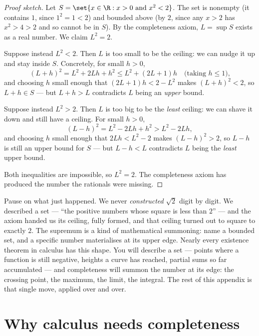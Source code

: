 \begin{proof}[Proof sketch]
Let $S = \set{x\in\R : x > 0 \text{ and } x^2 < 2}$. The set is nonempty (it contains $1$,
since $1^2=1<2$) and bounded above (by $2$, since any $x>2$ has $x^2>4>2$ and so cannot be
in $S$). By the completeness axiom, $L=\sup S$ exists as a real number. We claim $L^2=2$.

Suppose instead $L^2 < 2$. Then $L$ is too small to be the ceiling: we can nudge it up and
stay inside $S$. Concretely, for small $h>0$,
\[
  (L+h)^2 = L^2 + 2Lh + h^2 \le L^2 + (2L+1)h \quad\text{(taking $h\le 1$),}
\]
and choosing $h$ small enough that $(2L+1)h < 2 - L^2$ makes $(L+h)^2 < 2$, so
$L+h\in S$ --- but $L+h>L$ contradicts $L$ being an \emph{upper} bound.

Suppose instead $L^2 > 2$. Then $L$ is too big to be the \emph{least} ceiling: we can
shave it down and still have a ceiling. For small $h>0$,
\[
  (L-h)^2 = L^2 - 2Lh + h^2 > L^2 - 2Lh,
\]
and choosing $h$ small enough that $2Lh < L^2 - 2$ makes $(L-h)^2 > 2$, so $L-h$ is still
an upper bound for $S$ --- but $L-h<L$ contradicts $L$ being the \emph{least} upper bound.

Both inequalities are impossible, so $L^2 = 2$. The completeness axiom has produced the
number the rationals were missing.
\end{proof}

\begin{aestheticbox}
Pause on what just happened. We never \emph{constructed} $\sqrt 2$ digit by digit. We
described a set --- ``the positive numbers whose square is less than $2$'' --- and the
axiom handed us its ceiling, fully formed, and that ceiling turned out to square to
exactly $2$. The supremum is a kind of mathematical summoning: name a bounded set, and a
specific number materialises at its upper edge. Nearly every existence theorem in calculus
has this shape. You will describe a set --- points where a function is still negative,
heights a curve has reached, partial sums so far accumulated --- and completeness will
summon the number at its edge: the crossing point, the maximum, the limit, the integral.
The rest of this appendix is that single move, applied over and over.
\end{aestheticbox}

\section{Why calculus needs completeness}
\label{ch41:needs}


